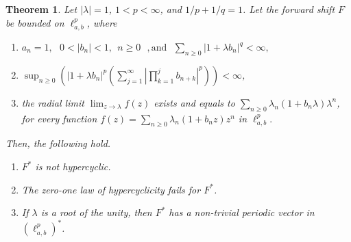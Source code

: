 \documentclass[12pt, reqno]{amsart}
\newtheorem{theorem}{Theorem}[section]
\theoremstyle{definition}
\theoremstyle{remark}
\numberwithin{equation}{section}
\begin{document}
\begin{theorem} \label{pr}
Let $|\lambda|=1$, $1<p<\infty$, and $1/p+1/q=1$. Let the forward shift $F$ be bounded on $\ell^p_{a,b}$, where
\begin{enumerate}
    \item[\textnormal{(A1)}] $a_{n}=1,~~~ 0<|b_n|<1,~~ n\geq 0~~~,\text{and}~~~\sum_{n\geq 0} |1+\lambda b_n|^q<\infty,$
\item[\textnormal{(A2)}]  $\sup_{n\geq 0}\left(|1+\lambda b_{n}|^{p}\left(\sum_{j=1}^{\infty}
\left|\prod_{k=1}^{j} b_{n+k}
\right|^{p}\right)\right)<\infty$,
\item[\textnormal{(A3)}] the radial limit $\lim_{z\rightarrow \lambda} f(z)$ exists and equals to $\sum_{n\geq 0}\lambda_n (1+b_n\lambda)\lambda^n$, for every function $f(z)=\sum_{n\geq 0}\lambda_n (1+b_nz)z^n$ in $\ell^p_{a,b}.$
\end{enumerate}
Then, the following hold.
\begin{enumerate}
\item[\textnormal{(i)}] $F^*$ is not hypercyclic.
\item[\textnormal{(ii)}]  The zero-one law of hypercyclicity fails for $F^*$.
\item[\textnormal{(iii)}] If $\lambda$ is a root of the unity, then $F^{*}$ has a non-trivial periodic vector in $(\ell^p_{a,b})^{*}$.
\end{enumerate}
\end{theorem}
\end{document}
